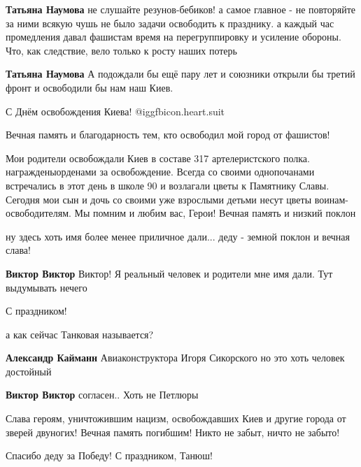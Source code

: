 \begin{itemize}
\begin{itemize} %
\textbf{Татьяна Наумова} не слушайте резунов-бебиков! а самое главное - не повторяйте за ними всякую чушь
не было задачи освободить к празднику.
а каждый час промедления давал фашистам время на перегруппировку и усиление обороны. Что, как следствие, вело только к росту наших потерь

\textbf{Татьяна Наумова} А подождали бы ещё пару лет и союзники открыли бы третий фронт и освободили бы нам наш Киев.
\end{itemize} %

С Днём освобождения Киева! @igg{fbicon.heart.suit}

Вечная память и благодарность тем, кто освободил мой город от фашистов!


Мои родители освобождали Киев в составе 317 артелеристского
полка. награжденыорденами за освобождение. Всегда со своими однопочанами
встречались в этот день в школе 90 и возлагали цветы к Памятнику Славы. Сегодня
мои сын и дочь со своими уже взрослыми детьми несут цветы воинам-
освободителям. Мы помним и любим вас, Герои! Вечная память и низкий поклон

ну здесь хоть имя более менее приличное дали...
деду - земной поклон и вечная слава!

\begin{itemize} %
\textbf{Виктор Виктор} Виктор! Я реальный человек и родители мне имя дали. Тут выдумывать нечего
\end{itemize} %

С праздником!

а как сейчас Танковая называется?

\begin{itemize} %
\textbf{Александр Кайманн} Авиаконструктора Игоря Сикорского
но это хоть человек достойный

\textbf{Виктор Виктор} согласен.. Хоть не Петлюры
\end{itemize} %


Слава героям, уничтожившим нацизм, освобождавших Киев и другие города от зверей
двуногих! Вечная память погибшим! Никто не забыт, ничто не забыто!


Спасибо деду за Победу! С праздником, Танюш!


\end{itemize}
